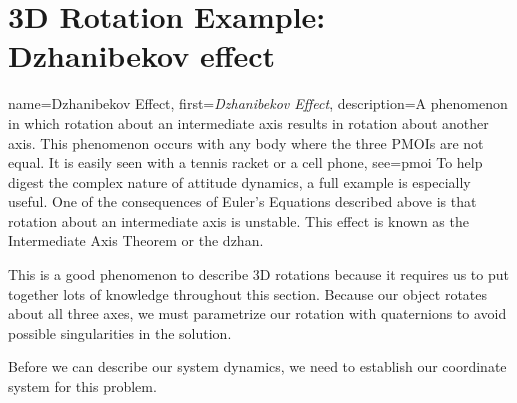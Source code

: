 \documentclass[12pt]{report}
\begin{document}
\section{3D Rotation Example: Dzhanibekov effect}\label{sec:Dzhan}

{
    name={Dzhanibekov Effect},
    first=\textit{Dzhanibekov Effect},
    description={A phenomenon in which rotation about an intermediate axis results in rotation about another axis. This phenomenon occurs with any body where the three PMOIs are not equal. It is easily seen with a tennis racket or a cell phone},
    see={pmoi}
}
To help digest the complex nature of attitude dynamics, a full example is especially useful. One of the consequences of Euler's Equations described %
above is that rotation about an intermediate axis is unstable. This effect is known as the Intermediate Axis Theorem or the \gls{dzhan}.

This is a good phenomenon to describe 3D rotations because it requires us to put together lots of knowledge throughout this section. Because our object rotates about all three axes, we must parametrize our rotation with \glspl{quaternion} to avoid possible singularities in the solution.

Before we can describe our system dynamics, we need to establish our coordinate system for this problem.
\end{document}
